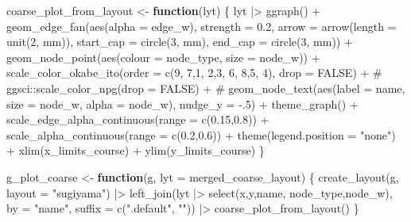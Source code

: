 \documentclass[
  letterpaper,
  DIV=11,
  numbers=noendperiod]{scrartcl}
\newenvironment{Shaded}{\begin{snugshade}}{\end{snugshade}}
\newcommand{\AttributeTok}[1]{\textcolor[rgb]{0.40,0.45,0.13}{#1}}
\newcommand{\CommentTok}[1]{\textcolor[rgb]{0.37,0.37,0.37}{#1}}
\newcommand{\ConstantTok}[1]{\textcolor[rgb]{0.56,0.35,0.01}{#1}}
\newcommand{\ControlFlowTok}[1]{\textcolor[rgb]{0.00,0.23,0.31}{\textbf{#1}}}
\newcommand{\DecValTok}[1]{\textcolor[rgb]{0.68,0.00,0.00}{#1}}
\newcommand{\FloatTok}[1]{\textcolor[rgb]{0.68,0.00,0.00}{#1}}
\newcommand{\FunctionTok}[1]{\textcolor[rgb]{0.28,0.35,0.67}{#1}}
\newcommand{\NormalTok}[1]{\textcolor[rgb]{0.00,0.23,0.31}{#1}}
\newcommand{\OtherTok}[1]{\textcolor[rgb]{0.00,0.23,0.31}{#1}}
\newcommand{\SpecialCharTok}[1]{\textcolor[rgb]{0.37,0.37,0.37}{#1}}
\newcommand{\StringTok}[1]{\textcolor[rgb]{0.13,0.47,0.30}{#1}}
\begin{document}
\begin{Shaded}
\begin{Highlighting}[]
\NormalTok{coarse\_plot\_from\_layout }\OtherTok{\textless{}{-}} \ControlFlowTok{function}\NormalTok{(lyt) \{}
\NormalTok{    lyt }\SpecialCharTok{|\textgreater{}} 
        \FunctionTok{ggraph}\NormalTok{() }\SpecialCharTok{+}
        \FunctionTok{geom\_edge\_fan}\NormalTok{(}\FunctionTok{aes}\NormalTok{(}\AttributeTok{alpha =}\NormalTok{ edge\_w), }\AttributeTok{strength =} \FloatTok{0.2}\NormalTok{,}
            \AttributeTok{arrow =} \FunctionTok{arrow}\NormalTok{(}\AttributeTok{length =} \FunctionTok{unit}\NormalTok{(}\DecValTok{2}\NormalTok{, }\StringTok{\textquotesingle{}mm\textquotesingle{}}\NormalTok{)),}
            \AttributeTok{start\_cap =} \FunctionTok{circle}\NormalTok{(}\DecValTok{3}\NormalTok{, }\StringTok{\textquotesingle{}mm\textquotesingle{}}\NormalTok{),}
            \AttributeTok{end\_cap =} \FunctionTok{circle}\NormalTok{(}\DecValTok{3}\NormalTok{, }\StringTok{\textquotesingle{}mm\textquotesingle{}}\NormalTok{)) }\SpecialCharTok{+}
        \FunctionTok{geom\_node\_point}\NormalTok{(}\FunctionTok{aes}\NormalTok{(}\AttributeTok{colour =}\NormalTok{ node\_type, }\AttributeTok{size =}\NormalTok{ node\_w)) }\SpecialCharTok{+}
        \FunctionTok{scale\_color\_okabe\_ito}\NormalTok{(}\AttributeTok{order =} \FunctionTok{c}\NormalTok{(}\DecValTok{9}\NormalTok{, }\DecValTok{7}\NormalTok{,}\DecValTok{1}\NormalTok{, }\DecValTok{2}\NormalTok{,}\DecValTok{3}\NormalTok{, }\DecValTok{6}\NormalTok{, }\DecValTok{8}\NormalTok{,}\DecValTok{5}\NormalTok{, }\DecValTok{4}\NormalTok{), }\AttributeTok{drop =} \ConstantTok{FALSE}\NormalTok{) }\SpecialCharTok{+}
        \CommentTok{\# ggsci::scale\_color\_npg(drop = FALSE) +}
        \CommentTok{\# geom\_node\_text(aes(label = name, size = node\_w, alpha = node\_w), nudge\_y = {-}.5) +}
        \FunctionTok{theme\_graph}\NormalTok{() }\SpecialCharTok{+}
        \FunctionTok{scale\_edge\_alpha\_continuous}\NormalTok{(}\AttributeTok{range =} \FunctionTok{c}\NormalTok{(}\FloatTok{0.15}\NormalTok{,}\FloatTok{0.8}\NormalTok{)) }\SpecialCharTok{+}
        \FunctionTok{scale\_alpha\_continuous}\NormalTok{(}\AttributeTok{range =} \FunctionTok{c}\NormalTok{(}\FloatTok{0.2}\NormalTok{,}\FloatTok{0.6}\NormalTok{)) }\SpecialCharTok{+}
        \FunctionTok{theme}\NormalTok{(}\AttributeTok{legend.position =} \StringTok{"none"}\NormalTok{) }\SpecialCharTok{+}
        \FunctionTok{xlim}\NormalTok{(x\_limits\_course) }\SpecialCharTok{+}
        \FunctionTok{ylim}\NormalTok{(y\_limits\_course)}
\NormalTok{\}}

\NormalTok{g\_plot\_coarse }\OtherTok{\textless{}{-}} \ControlFlowTok{function}\NormalTok{(g, }\AttributeTok{lyt =}\NormalTok{ merged\_coarse\_layout) \{}
    \FunctionTok{create\_layout}\NormalTok{(g, }\AttributeTok{layout =} \StringTok{"sugiyama"}\NormalTok{) }\SpecialCharTok{|\textgreater{}} 
        \FunctionTok{left\_join}\NormalTok{(lyt }\SpecialCharTok{|\textgreater{}} \FunctionTok{select}\NormalTok{(x,y,name, node\_type,node\_w), }\AttributeTok{by =} \StringTok{"name"}\NormalTok{,}
                  \AttributeTok{suffix =} \FunctionTok{c}\NormalTok{(}\StringTok{".default"}\NormalTok{, }\StringTok{""}\NormalTok{)) }\SpecialCharTok{|\textgreater{}} 
    \FunctionTok{coarse\_plot\_from\_layout}\NormalTok{()    }
\NormalTok{\}}


\end{Highlighting}
\end{Shaded}
\end{document}
